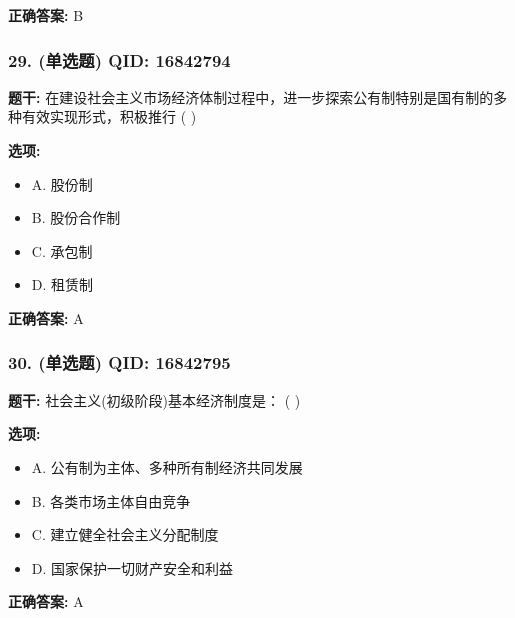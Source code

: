 \documentclass[12pt,UTF8]{ctexart}
\begin{document}
\textbf{正确答案:}
B

\vspace{0.3em}\hrulefill\vspace{0.7em}

\subsubsection*{29. (单选题) \small QID: 16842794}

\textbf{题干:}
在建设社会主义市场经济体制过程中，进一步探索公有制特别是国有制的多种有效实现形式，积极推行 ( )

\textbf{选项:}
\begin{itemize}[leftmargin=*]

  \item A. 股份制

  \item B. 股份合作制

  \item C. 承包制

  \item D. 租赁制

\end{itemize}

\textbf{正确答案:}
A

\vspace{0.3em}\hrulefill\vspace{0.7em}

\subsubsection*{30. (单选题) \small QID: 16842795}

\textbf{题干:}
社会主义(初级阶段)基本经济制度是： ( )

\textbf{选项:}
\begin{itemize}[leftmargin=*]

  \item A. 公有制为主体、多种所有制经济共同发展

  \item B. 各类市场主体自由竞争

  \item C. 建立健全社会主义分配制度

  \item D. 国家保护一切财产安全和利益

\end{itemize}

\textbf{正确答案:}
A

\vspace{0.3em}\hrulefill\vspace{0.7em}
\end{document}
